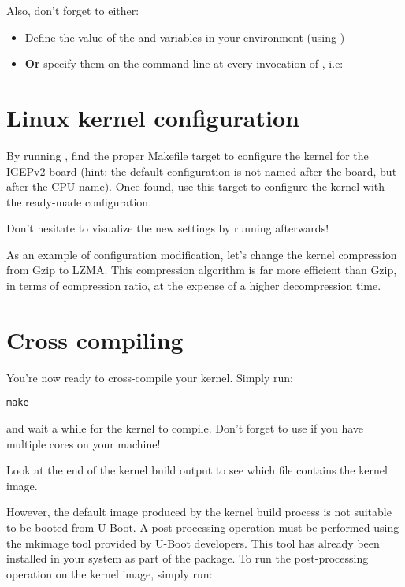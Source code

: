 Also, don't forget to either:

\begin{itemize}
\item Define the value of the  and 
  variables in your environment (using )
\item {\bf Or} specify them on the command line at every invocation of
  , i.e: 
\end{itemize}

\section{Linux kernel configuration}

By running , find the proper Makefile target to
configure the kernel for the IGEPv2 board (hint: the default
configuration is not named after the board, but after the CPU
name). Once found, use this target to configure the kernel with the
ready-made configuration.

Don't hesitate to visualize the new settings by running
 afterwards!

As an example of configuration modification, let's change the kernel
compression from Gzip to LZMA. This compression algorithm is far more
efficient than Gzip, in terms of compression ratio, at the expense of
a higher decompression time.

\section{Cross compiling}

You're now ready to cross-compile your kernel. Simply run:

\begin{verbatim}
make
\end{verbatim}

and wait a while for the kernel to compile. Don't forget to use
 if you have multiple cores on your machine!

Look at the end of the kernel build output to see which file contains
the kernel image.

However, the default image produced by the kernel build process is not
suitable to be booted from U-Boot. A post-processing operation must be
performed using the mkimage tool provided by U-Boot developers. This
tool has already been installed in your system as part of the
 package. To run the post-processing operation on
the kernel image, simply run:

